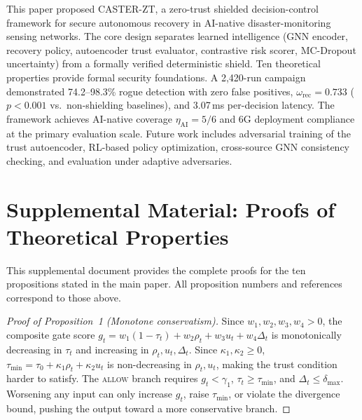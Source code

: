 This paper proposed CASTER-ZT, a zero-trust shielded decision-control framework for secure autonomous recovery in AI-native disaster-monitoring sensing networks.
The core design separates learned intelligence (GNN encoder, recovery policy, autoencoder trust evaluator, contrastive risk scorer, MC-Dropout uncertainty) from a formally verified deterministic shield.
Ten theoretical properties provide formal security foundations.
A 2,420-run campaign demonstrated 74.2--98.3\% rogue detection with zero false positives, $\omega_{\mathrm{rec}}=0.733$ ($p<0.001$ vs.\ non-shielding baselines), and 3.07\,ms per-decision latency.
The framework achieves AI-native coverage $\eta_{\mathrm{AI}}=5/6$ and 6G deployment compliance at the primary evaluation scale.
Future work includes adversarial training of the trust autoencoder, RL-based policy optimization, cross-source GNN consistency checking, and evaluation under adaptive adversaries.




\section*{Supplemental Material: Proofs of Theoretical Properties}

This supplemental document provides the complete proofs for the ten propositions stated in the main paper.
All proposition numbers and references correspond to those above.

\bigskip

\begin{proof}[Proof of Proposition~1 (Monotone conservatism)]
Since $w_1, w_2, w_3, w_4 > 0$, the composite gate score $g_t = w_1(1-\tau_t)+w_2\rho_t+w_3 u_t+w_4\Delta_t$ is monotonically decreasing in $\tau_t$ and increasing in $\rho_t, u_t, \Delta_t$.
Since $\kappa_1, \kappa_2 \ge 0$, $\tau_{\min} = \tau_0 + \kappa_1\rho_t + \kappa_2 u_t$ is non-decreasing in $\rho_t, u_t$, making the trust condition harder to satisfy.
The \textsc{allow} branch requires $g_t < \gamma_1$, $\tau_t \ge \tau_{\min}$, and $\Delta_t \le \delta_{\max}$.
Worsening any input can only increase $g_t$, raise $\tau_{\min}$, or violate the divergence bound, pushing the output toward a more conservative branch.
\end{proof}

